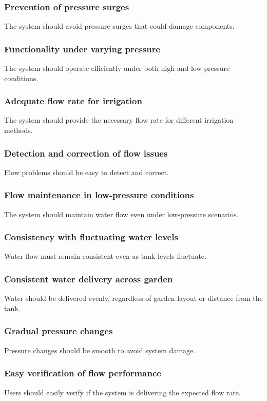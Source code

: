 \documentclass[11pt]{article}
\begin{document}
\subsubsection{Prevention of pressure surges}
The system should avoid pressure surges that could damage components.

\subsubsection{Functionality under varying pressure}
The system should operate efficiently under both high and low pressure conditions.

\subsubsection{Adequate flow rate for irrigation}
The system should provide the necessary flow rate for different irrigation methods.

\subsubsection{Detection and correction of flow issues}
Flow problems should be easy to detect and correct.

\subsubsection{Flow maintenance in low-pressure conditions}
The system should maintain water flow even under low-pressure scenarios.

\subsubsection{Consistency with fluctuating water levels}
Water flow must remain consistent even as tank levels fluctuate.

\subsubsection{Consistent water delivery across garden}
Water should be delivered evenly, regardless of garden layout or distance from the tank.

\subsubsection{Gradual pressure changes}
Pressure changes should be smooth to avoid system damage.
\subsubsection{Easy verification of flow performance}
Users should easily verify if the system is delivering the expected flow rate.
\end{document}
